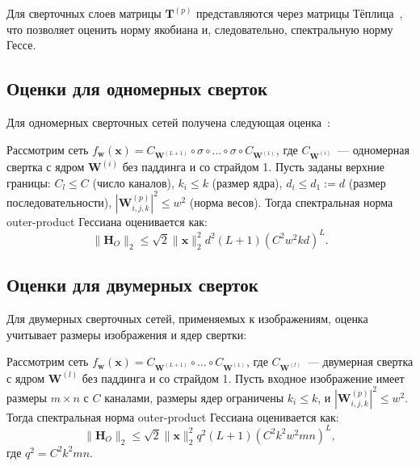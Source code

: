 Для сверточных слоев матрицы $\mathbf{T}^{(p)}$ представляются через матрицы Тёплица~\cite{singh2023hessianperspectivenatureconvolutional}, что позволяет оценить норму якобиана и, следовательно, спектральную норму Гессе.

\subsection{Оценки для одномерных сверток}

Для одномерных сверточных сетей получена следующая оценка~\cite{meshkov2024convnets}:

\begin{theorem}\label{th:1d-conv-hessian}
Рассмотрим сеть $f_{\mathbf{w}}(\mathbf{x}) = C_{\mathbf{W}^{(L+1)}} \circ \sigma \circ \ldots \circ \sigma \circ C_{\mathbf{W}^{(1)}}$, где $C_{\mathbf{W}^{(i)}}$~--- одномерная свертка с ядром $\mathbf{W}^{(i)}$ без паддинга и со страйдом 1. Пусть заданы верхние границы: $C_l \leqslant C$ (число каналов), $k_i \leqslant k$ (размер ядра), $d_i \leqslant d_1 := d$ (размер последовательности), $|\mathbf{W}^{(p)}_{i,j,k}|^2 \leqslant w^2$ (норма весов). Тогда спектральная норма outer-product Гессиана оценивается как:
\begin{equation}
\label{eq:1d-conv-hessian-bound}
\|\mathbf{H}_O\|_2 \leqslant \sqrt{2} \|\mathbf{x}\|_2^2 d^2 (L+1) (C^2 w^2 k d)^L.
\end{equation}
\end{theorem}

\subsection{Оценки для двумерных сверток}

Для двумерных сверточных сетей, применяемых к изображениям, оценка учитывает размеры изображения и ядер свертки:

\begin{theorem}\label{th:2d-conv-hessian}
Рассмотрим сеть $f_{\mathbf{w}}(\mathbf{x}) = C_{\mathbf{W}^{(L+1)}} \circ \ldots \circ C_{\mathbf{W}^{(1)}}$, где $C_{\mathbf{W}^{(l)}}$~--- двумерная свертка с ядром $\mathbf{W}^{(l)}$ без паддинга и со страйдом 1. Пусть входное изображение имеет размеры $m \times n$ с $C$ каналами, размеры ядер ограничены $k_i \leqslant k$, и $|\mathbf{W}^{(p)}_{i,j,k}|^2 \leqslant w^2$. Тогда спектральная норма outer-product Гессиана оценивается как:
\begin{equation}
\label{eq:2d-conv-hessian-bound}
\|\mathbf{H}_O\|_2 \leqslant \sqrt{2} \|\mathbf{x}\|_2^2 q^2 (L+1) (C^2 k^2 w^2 m n)^L,
\end{equation}
где $q^2 = C^2 k^2 m n$.
\end{theorem}

